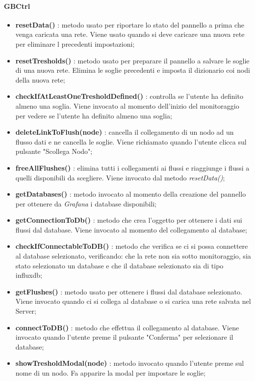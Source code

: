 	  \paragraph{GBCtrl} 
		\begin{itemize}
			\item \textbf{resetData()} : metodo usato per riportare lo stato del pannello a prima che venga caricata una rete. Viene usato quando si deve caricare una nuova rete per eliminare l precedenti impostazioni;
			\item \textbf{resetTresholds()} : metodo usato per preparare il pannello a salvare le soglie di una nuova rete. Elimina le soglie precedenti e imposta il dizionario coi nodi della nuova rete;
			\item \textbf{checkIfAtLeastOneTresholdDefined()} : controlla se l'utente ha definito almeno una soglia. Viene invocato al momento dell'inizio del monitoraggio per vedere se l'utente ha definito almeno una soglia;
			\item \textbf{deleteLinkToFlush(node)} : cancella il collegamento di un nodo ad un flusso dati e ne cancella le soglie. Viene richiamato quando l'utente clicca sul pulsante "Scollega Nodo";
			\item \textbf{freeAllFlushes()} : elimina tutti i collegamenti ai flussi e riaggiunge i flussi a quelli disponibili da scegliere. Viene invocato dal metodo \textit{resetData()};
			\item \textbf{getDatabases()} : metodo invocato al momento della creazione del pannello per ottenere da \textit{Grafana} i database disponibili;
			\item \textbf{getConnectionToDb()} : metodo che crea l'oggetto per ottenere i dati sui flussi dal database. Viene invocato al momento del collegamento al database;
			\item \textbf{checkIfConnectableToDB()} : metodo che verifica se ci si possa connettere al database selezionato, verificando: che la rete non sia sotto monitoraggio, sia stato selezionato un database e che il database selezionato sia di tipo influxdb;
			\item \textbf{getFlushes()} : metodo usato per ottenere i flussi dal database selezionato. Viene invocato quando ci si collega al database  o si carica una rete salvata nel Server;
			\item \textbf{connectToDB()} : metodo che effettua il collegamento al database. Viene invocato quando l'utente preme il pulsante "Conferma" per selezionare il database;
			\item \textbf{showTresholdModal(node)} : metodo invocato quando l'utente preme sul nome di un nodo. Fa apparire la modal per impostare le soglie;

\end{itemize}
